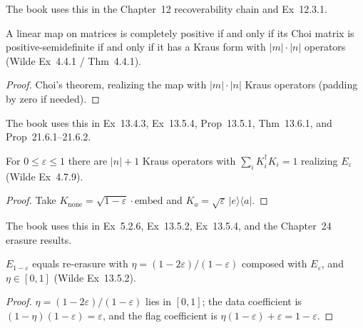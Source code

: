The book uses this in the Chapter~12 recoverability chain and Ex~12.3.1.

\begin{theorem}
  \label{thm:choi_theorem}
  A linear map on matrices is completely positive if and only if its Choi
  matrix is positive-semidefinite if and only if it has a Kraus form with
  $\lvert m\rvert\cdot\lvert n\rvert$ operators (Wilde Ex~4.4.1 / Thm~4.4.1).
\end{theorem}

\begin{proof}
  Choi's theorem, realizing the map with $\lvert m\rvert\cdot\lvert n\rvert$
  Kraus operators (padding by zero if needed).
\end{proof}

The book uses this in Ex~13.4.3, Ex~13.5.4, Prop~13.5.1, Thm~13.6.1, and
Prop~21.6.1--21.6.2.

\begin{theorem}
  \label{thm:erasure_kraus}
  For $0\le\varepsilon\le 1$ there are $\lvert n\rvert+1$ Kraus operators with
  $\sum_i K_i^\dagger K_i = 1$ realizing $E_\varepsilon$ (Wilde Ex~4.7.9).
\end{theorem}

\begin{proof}
  Take $K_{\mathrm{none}}=\sqrt{1-\varepsilon}\cdot\mathrm{embed}$ and
  $K_a=\sqrt{\varepsilon}\,\lvert e\rangle\langle a\rvert$.
\end{proof}

The book uses this in Ex~5.2.6, Ex~13.5.2, Ex~13.5.4, and the Chapter~24
erasure results.

\begin{theorem}
  \label{thm:erasure_degradable}
  $E_{1-\varepsilon}$ equals re-erasure with
  $\eta=(1-2\varepsilon)/(1-\varepsilon)$ composed with $E_\varepsilon$, and
  $\eta\in[0,1]$ (Wilde Ex~13.5.2).
\end{theorem}

\begin{proof}
  $\eta=(1-2\varepsilon)/(1-\varepsilon)$ lies in $[0,1]$; the data coefficient
  is $(1-\eta)(1-\varepsilon)=\varepsilon$, and the flag coefficient is
  $\eta(1-\varepsilon)+\varepsilon=1-\varepsilon$.
\end{proof}

